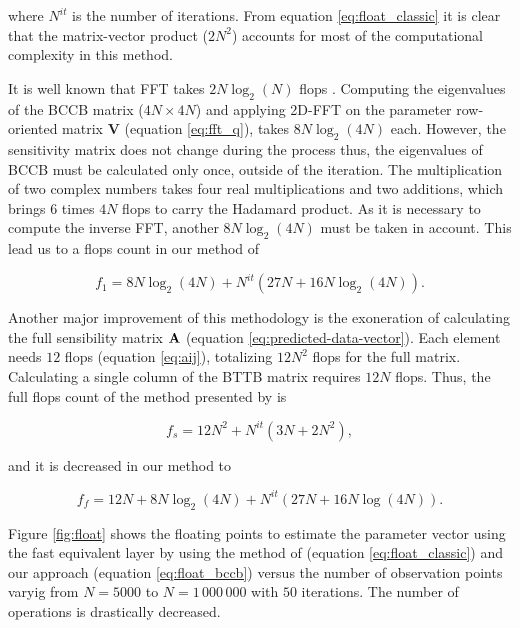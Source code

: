 \documentclass[manuscript,revised]{geophysics}
\begin{document}
\noindent where $N^{it}$ is the number of iterations. From equation \ref{eq:float_classic} it is clear that the matrix-vector product ($2N^2$) accounts for most of the computational complexity in this method.

It is well known that FFT takes $2 N \log_2(N)$ flops \citep{chu1999inside}. Computing the eigenvalues of the BCCB matrix ($4N \times 4N$) and applying 2D-FFT on the parameter row-oriented matrix $\mathbf{V}$ (equation \ref{eq:fft_q}), takes $8N \log_2(4N)$ each. However, the sensitivity matrix does not change during the process thus, the eigenvalues of BCCB must be calculated only once, outside of the iteration. The multiplication of two complex numbers takes four real multiplications and two additions, which brings 6 times $4N$ flops to carry the Hadamard product. As it is necessary to compute the inverse FFT, another $8N \log_2(4N)$ must be taken in account. This lead us to a flops count in our method of

\begin{equation}
f_1 = 8N\log_2(4N) + N^{it} (27N + 16N\log_2(4N)).
\label{eq:float_bccb}
\end{equation}

Another major improvement of this methodology is the exoneration of calculating the full sensibility matrix $\tensor{A}$ (equation \ref{eq:predicted-data-vector}). Each element needs $12$ flops (equation \ref{eq:aij}), totalizing $12N^2$ flops for the full matrix. Calculating a single column of the BTTB matrix requires $12N$ flops.
Thus, the full flops count of the method presented by \citet{siqueira-etal2017} is

\begin{equation}
f_s = 12N^2 + N^{it} (3N + 2N^2),
\label{eq:float_siqueira}
\end{equation}

and it is decreased in our method to

\begin{equation}
f_f = 12N + 8N \log_2(4N) + N^{it} (27N + 16N\log(4N)).
\label{eq:float_new}
\end{equation}

Figure \ref{fig:float} shows the floating points to estimate the parameter vector using the fast equivalent layer by using the method of \citet{siqueira-etal2017} (equation \ref{eq:float_classic}) and our approach (equation \ref{eq:float_bccb}) versus the number of observation points varyig from $N = 5000$ to $N = 1\,000\,000$ with $50$ iterations. The number of operations is drastically decreased.
\end{document}
